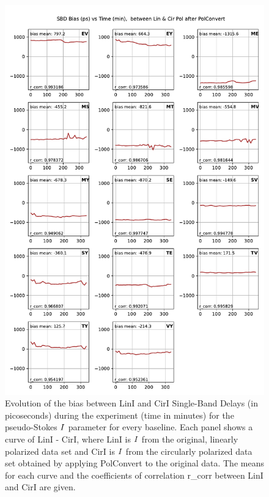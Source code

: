 \documentclass[letterpaper,twoside,12pt]{article}
\begin{document}
\begin{figure}[ht!]
  \begin{center}
  \includegraphics[width=33pc]{SBD_bias_between_Lin_I_and_Cir_I.pdf}
  \caption{\small Evolution of the bias between LinI and CirI Single-Band Delays (in picoseconds) during the experiment (time in minutes) for the pseudo-Stokes $\protect I$ parameter for every baseline. Each panel shows a curve of LinI - CirI, where LinI is $\protect I$ from the original, linearly polarized data set and CirI is $\protect I$ from the circularly polarized data set obtained by applying PolConvert to the original data. The means for each curve and the coefficients of correlation r\_corr between LinI and CirI are given.}
  \label{sbd_lin_cir_bias}
  \end{center}
\end{figure}
\end{document}
